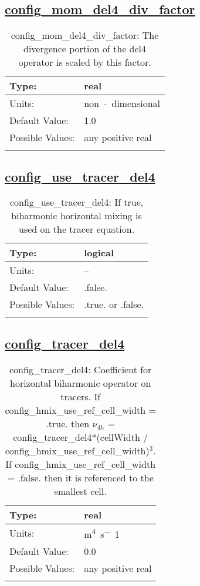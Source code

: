 \subsection[config\_mom\_del4\_div\_factor]{\hyperref[sec:nm_tab_hmix_del4]{config\_mom\_del4\_div\_factor}}
\label{subsec:nm_sec_config_mom_del4_div_factor}
\begin{center}
\begin{longtable}{| p{2.0in} || p{4.0in} |}
    \hline
    Type: & real \\
    \hline
    Units: & \si{non-dimensional} \\
    \hline
    Default Value: & 1.0 \\
    \hline
    Possible Values: & any positive real \\
    \hline
    \caption{config\_mom\_del4\_div\_factor: The divergence portion of the del4 operator is scaled by this factor.}
\end{longtable}
\end{center}
\subsection[config\_use\_tracer\_del4]{\hyperref[sec:nm_tab_hmix_del4]{config\_use\_tracer\_del4}}
\label{subsec:nm_sec_config_use_tracer_del4}
\begin{center}
\begin{longtable}{| p{2.0in} || p{4.0in} |}
    \hline
    Type: & logical \\
    \hline
    Units: & -- \\
    \hline
    Default Value: & .false. \\
    \hline
    Possible Values: & .true. or .false. \\
    \hline
    \caption{config\_use\_tracer\_del4: If true, biharmonic horizontal mixing is used on the tracer equation.}
\end{longtable}
\end{center}
\subsection[config\_tracer\_del4]{\hyperref[sec:nm_tab_hmix_del4]{config\_tracer\_del4}}
\label{subsec:nm_sec_config_tracer_del4}
\begin{center}
\begin{longtable}{| p{2.0in} || p{4.0in} |}
    \hline
    Type: & real \\
    \hline
    Units: & \si{m^4.s^-1} \\
    \hline
    Default Value: & 0.0 \\
    \hline
    Possible Values: & any positive real \\
    \hline
    \caption{config\_tracer\_del4: Coefficient for horizontal biharmonic operator on tracers.  If config\_hmix\_use\_ref\_cell\_width = .true. then $\nu_{4h}$ = config\_tracer\_del4*(cellWidth / config\_hmix\_use\_ref\_cell\_width)$^3$. If config\_hmix\_use\_ref\_cell\_width = .false. then it is referenced to the smallest cell.}
\end{longtable}
\end{center}
